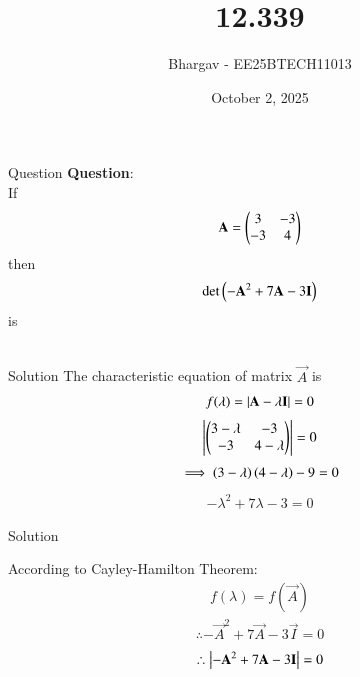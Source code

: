 \documentclass{beamer}
\title{12.339}
\date{October 2, 2025}
\author{Bhargav - EE25BTECH11013}
\begin{document}
\frame{\titlepage}

\begin{frame}{Question}
\textbf{Question}: \\
If
\begin{align}
\mathbf{A} = \begin{pmatrix}3 & -3 \\ -3 & 4\end{pmatrix}
\end{align}
then 
\begin{align}
\det{\ensuremath{\left(-\mathbf{A}^2 + 7\mathbf{A} - 3\mathbf{I}\right)}}
\end{align}
is \\ \\
\end{frame}


\begin{frame}{Solution}
The characteristic equation of matrix $\vec{A}$ is
\begin{align}
f(\lambda) = \left\vert\mathbf{A} - \lambda\mathbf{I}\right\vert = 0
\end{align}
\begin{align}
\left\vert\begin{pmatrix}3-\lambda & -3 \\ -3 & 4-\lambda\end{pmatrix}\right\vert = 0
\end{align}
\begin{align}
\implies \left(3-\lambda\right)\left(4-\lambda\right) - 9 = 0
\end{align}
\begin{align}
-\lambda^2 + 7\lambda -3 = 0
\end{align}

\end{frame}

\begin{frame}{Solution}

According to Cayley-Hamilton Theorem:
\begin{align}
f(\lambda) = f(\vec{A})
\end{align}
\begin{align}
\therefore -\vec{A}^2 + 7\vec{A} - 3\vec{I} = 0
\end{align}
\begin{align}
\therefore \left\vert-\mathbf{A}^2 + 7\mathbf{A} - 3\mathbf{I}\right\vert = 0
\end{align}
\end{frame}
\end{document}
